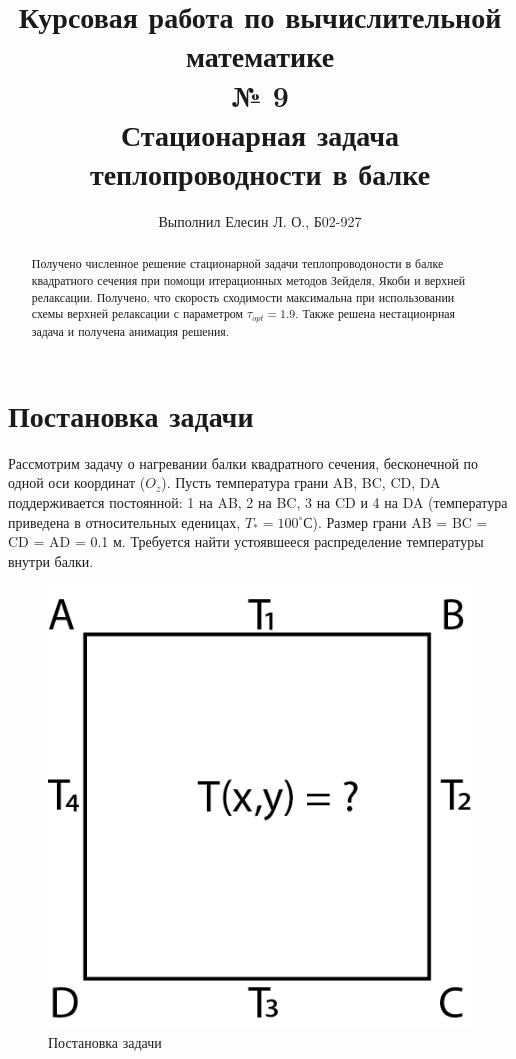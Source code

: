 \documentclass[20pt]{article}
\begin{document}
    \title{Курсовая работа по вычислительной математике \\ \textbf{№ 9 \\ Стационарная задача теплопроводности в балке }}
        \author{Выполнил Елесин Л. О., Б02-927}
        
    \maketitle

\begin{abstract}
    Получено численное решение стационарной задачи теплопроводоности в балке квадратного сечения при помощи итерационных методов Зейделя, Якоби и верхней релаксации. Получено, что скорость сходимости максимальна при использовании схемы верхней релаксации с параметром $\tau_{opt} = 1.9 $. Также решена нестационрная задача и получена анимация решения.
\end{abstract}
    
\section{Постановка задачи}
    Рассмотрим задачу о нагревании балки квадратного сечения, бесконечной по одной оси координат ($O_{z}$).
    Пусть температура грани AB, BC, CD, DA поддерживается постоянной: 1 на AB, 2 на BC, 3 на CD и 4 на DA (температура приведена в относительных еденицах, $T_{*} = 100^\circ С$). Размер грани AB = BC = CD = AD = 0.1 м. Требуется найти устоявшееся распределение температуры внутри балки.
    \begin{figure}[h!]
        \centering
        \includegraphics{puzzle.png}
        \caption{Постановка задачи}
        \label{setup}
    \end{figure}
 
\end{document}
